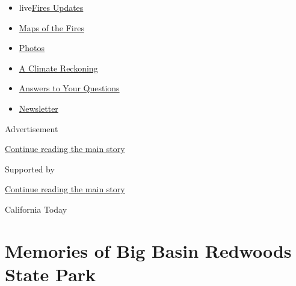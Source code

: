\begin{itemize}
\tightlist
\item
  live\href{https://www.nytimes3xbfgragh.onion/2020/09/12/us/wildfires-live-updates.html?name=styln-california-wildfires\&region=TOP_BANNER\&block=storyline_menu_recirc\&action=click\&pgtype=Article\&impression_id=0575a171-f52d-11ea-afee-9f6e96515e5b\&variant=undefined}{Fires
  Updates}
\item
  \href{https://www.nytimes3xbfgragh.onion/interactive/2020/us/fires-map-tracker.html?name=styln-california-wildfires\&region=TOP_BANNER\&block=storyline_menu_recirc\&action=click\&pgtype=Article\&impression_id=0575a172-f52d-11ea-afee-9f6e96515e5b\&variant=undefined}{Maps
  of the Fires}
\item
  \href{https://www.nytimes3xbfgragh.onion/article/wildfires-photos-california-oregon-washington-state.html?name=styln-california-wildfires\&region=TOP_BANNER\&block=storyline_menu_recirc\&action=click\&pgtype=Article\&impression_id=0575a173-f52d-11ea-afee-9f6e96515e5b\&variant=undefined}{Photos}
\item
  \href{https://www.nytimes3xbfgragh.onion/2020/09/10/us/climate-change-california-wildfires.html?name=styln-california-wildfires\&region=TOP_BANNER\&block=storyline_menu_recirc\&action=click\&pgtype=Article\&impression_id=0575a174-f52d-11ea-afee-9f6e96515e5b\&variant=undefined}{A
  Climate Reckoning}
\item
  \href{https://www.nytimes3xbfgragh.onion/article/wildfires-california-oregon-washington.html?name=styln-california-wildfires\&region=TOP_BANNER\&block=storyline_menu_recirc\&action=click\&pgtype=Article\&impression_id=0575c880-f52d-11ea-afee-9f6e96515e5b\&variant=undefined}{Answers
  to Your Questions}
\item
  \href{https://www.nytimes3xbfgragh.onion/2020/09/09/us/california-wildfires.html?name=styln-california-wildfires\&region=TOP_BANNER\&block=storyline_menu_recirc\&action=click\&pgtype=Article\&impression_id=0575c881-f52d-11ea-afee-9f6e96515e5b\&variant=undefined}{Newsletter}
\end{itemize}

Advertisement

\protect\hyperlink{after-top}{Continue reading the main story}

Supported by

\protect\hyperlink{after-sponsor}{Continue reading the main story}

California Today

\hypertarget{memories-of-big-basin-redwoods-state-park}{%
\section{Memories of Big Basin Redwoods State
Park}\label{memories-of-big-basin-redwoods-state-park}}

